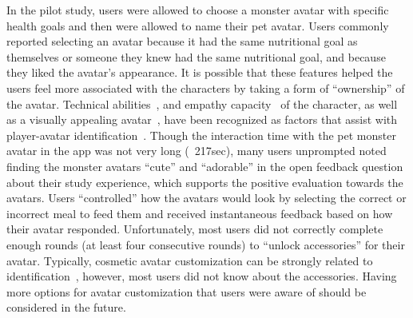 In the pilot study, users were allowed to choose a monster avatar with specific health goals and then were allowed to name their pet avatar. 
Users commonly reported selecting an avatar because it had the same nutritional goal as themselves or someone they knew had the same nutritional goal, and because they liked the avatar's appearance. 
It is possible that these features helped the users feel more associated with the characters by taking a form of ``ownership'' of the avatar. 
Technical abilities~\cite{newman2002myth}, and empathy capacity~\cite{cohen2006audience} of the character, as well as a visually appealing avatar~\cite{kim2012became}, have been recognized as factors that assist with player-avatar identification~\cite{turkay2014effects}.
Though the interaction time with the pet monster avatar in the app was not very long (~217sec), many users unprompted noted finding the monster avatars ``cute'' and ``adorable'' in the open feedback question about their study experience, which supports the positive evaluation towards the avatars.
Users ``controlled'' how the avatars would look by selecting the correct or incorrect meal to feed them and received instantaneous feedback based on how their avatar responded. 
Unfortunately, most users did not correctly complete enough rounds (at least four consecutive rounds) to ``unlock accessories'' for their avatar. Typically, cosmetic avatar customization can be strongly related to identification~\cite{turkay2014effects}, however, most users did not know about the accessories. 
Having more options for avatar customization that users were aware of should be considered in the future. 

\vspace{-5pt}
